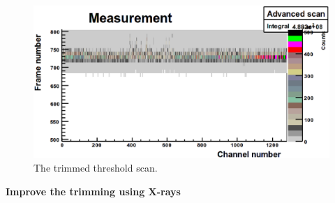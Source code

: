 \begin{figure}
\begin{center}
\includegraphics[width=\textwidth]{images/noise_thresholdscantrimmed}
\end{center}
\caption{The trimmed threshold scan.}\label{fig:thresholdscantrimmed}
\end{figure}
\textbf{
Improve the trimming using X-rays}\label{sec:improvetrimming}\\

